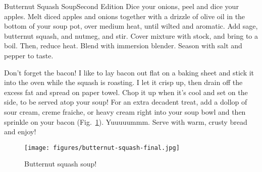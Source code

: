 \begin{entry}{Butternut Squash Soup}{Second Edition}
Dice your onions, peel and dice your apples. Melt diced apples and onions
together with a drizzle of olive oil in the bottom of your soup pot, over
medium heat, until wilted and aromatic. Add sage, butternut squash, and
nutmeg, and stir. Cover mixture with stock, and bring to a boil. Then, reduce
heat. Blend with immersion blender. Season with salt and pepper to taste.

Don't forget the bacon! I like to lay bacon out flat on a baking sheet and stick
it into the oven while the squash is roasting. I let it crisp up, then drain off
the excess fat and spread on paper towel. Chop it up when it's cool and set on
the side, to be served atop your soup! For an extra decadent treat, add a dollop
of sour cream, creme fraiche, or heavy cream right into your soup bowl and then
sprinkle on your bacon (Fig.~\ref{fig:butternut-squash-soup}). Yuuuuummm. Serve
with warm, crusty bread and enjoy!
\begin{figure}
    \centering
    \texttt{[image: figures/butternut-squash-final.jpg]}
    \caption{Butternut squash soup!}
    \label{fig:butternut-squash-soup}
\end{figure}
\end{entry}

